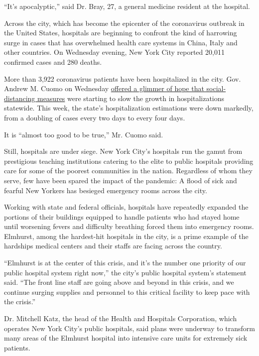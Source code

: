 ``It's apocalyptic,'' said Dr. Bray, 27, a general medicine resident at
the hospital.

Across the city, which has become the epicenter of the coronavirus
outbreak in the United States, hospitals are beginning to confront the
kind of harrowing surge in cases that has overwhelmed health care
systems in China, Italy and other countries. On Wednesday evening, New
York City reported 20,011 confirmed cases and 280 deaths.

More than 3,922 coronavirus patients have been hospitalized in the city.
Gov. Andrew M. Cuomo on Wednesday
\href{https://www.nytimes3xbfgragh.onion/2020/03/25/nyregion/coronavirus-new-york-update.html}{offered
a glimmer of hope that social-distancing measures} were starting to slow
the growth in hospitalizations statewide. This week, the state's
hospitalization estimations were down markedly, from a doubling of cases
every two days to every four days.

It is ``almost too good to be true,'' Mr. Cuomo said.

Still, hospitals are under siege. New York City's hospitals run the
gamut from prestigious teaching institutions catering to the elite to
public hospitals providing care for some of the poorest communities in
the nation. Regardless of whom they serve, few have been spared the
impact of the pandemic: A flood of sick and fearful New Yorkers has
besieged emergency rooms across the city.

Working with state and federal officials, hospitals have repeatedly
expanded the portions of their buildings equipped to handle patients who
had stayed home until worsening fevers and difficulty breathing forced
them into emergency rooms. Elmhurst, among the hardest-hit hospitals in
the city, is a prime example of the hardships medical centers and their
staffs are facing across the country.

``Elmhurst is at the center of this crisis, and it's the number one
priority of our public hospital system right now,'' the city's public
hospital system's statement said. ``The front line staff are going above
and beyond in this crisis, and we continue surging supplies and
personnel to this critical facility to keep pace with the crisis.''

Dr. Mitchell Katz, the head of the Health and Hospitals Corporation,
which operates New York City's public hospitals, said plans were
underway to transform many areas of the Elmhurst hospital into intensive
care units for extremely sick patients.

